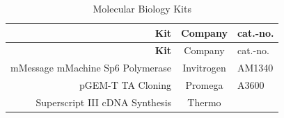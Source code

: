 \documentclass[11pt,singlespacinge,twoside]{reedthesis} %
\begin{document}
\begin{longtable}[]{@{}rcl@{}}
\caption{\label{tab:mat-mobikits} Molecular Biology Kits}\tabularnewline
\toprule
\begin{minipage}[b]{0.50\columnwidth}\raggedleft
\textbf{Kit}\strut
\end{minipage} & \begin{minipage}[b]{0.26\columnwidth}\centering
Company\strut
\end{minipage} & \begin{minipage}[b]{0.16\columnwidth}\raggedright
cat.-no.\strut
\end{minipage}\tabularnewline
\midrule
\endfirsthead
\toprule
\begin{minipage}[b]{0.50\columnwidth}\raggedleft
\textbf{Kit}\strut
\end{minipage} & \begin{minipage}[b]{0.26\columnwidth}\centering
Company\strut
\end{minipage} & \begin{minipage}[b]{0.16\columnwidth}\raggedright
cat.-no.\strut
\end{minipage}\tabularnewline
\midrule
\endhead
\begin{minipage}[t]{0.50\columnwidth}\raggedleft
mMessage mMachine Sp6 Polymerase\strut
\end{minipage} & \begin{minipage}[t]{0.26\columnwidth}\centering
Invitrogen\strut
\end{minipage} & \begin{minipage}[t]{0.16\columnwidth}\raggedright
AM1340\strut
\end{minipage}\tabularnewline
\begin{minipage}[t]{0.50\columnwidth}\raggedleft
pGEM-T TA Cloning\strut
\end{minipage} & \begin{minipage}[t]{0.26\columnwidth}\centering
Promega\strut
\end{minipage} & \begin{minipage}[t]{0.16\columnwidth}\raggedright
A3600\strut
\end{minipage}\tabularnewline
\begin{minipage}[t]{0.50\columnwidth}\raggedleft
Superscript III cDNA Synthesis\strut
\end{minipage} & \begin{minipage}[t]{0.26\columnwidth}\centering
Thermo\strut
\end{minipage} & \begin{minipage}[t]{0.16\columnwidth}\raggedright

\end{minipage}
\end{longtable}
\end{document}
